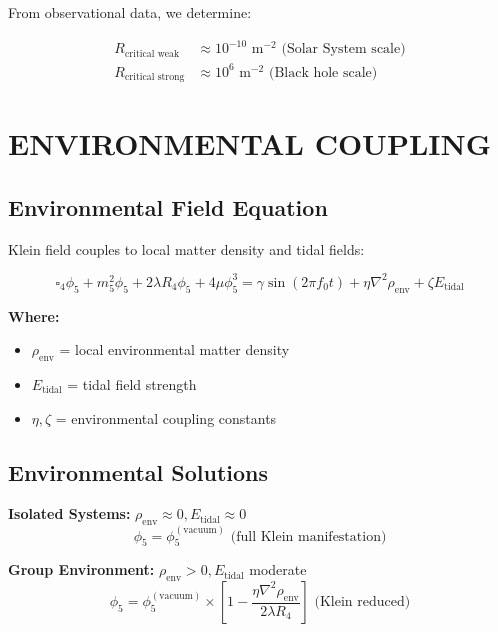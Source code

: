 \documentclass[12pt,a4paper]{article}
\begin{document}
From observational data, we determine:

\begin{align}
R_{\text{critical weak}} &\approx 10^{-10} \text{ m}^{-2} \text{ (Solar System scale)}\\
R_{\text{critical strong}} &\approx 10^6 \text{ m}^{-2} \text{ (Black hole scale)}
\end{align}

\section{ENVIRONMENTAL COUPLING}

\subsection{Environmental Field Equation}

Klein field couples to local matter density and tidal fields:

\begin{equation}
\square_4\phi_5 + m_5^2\phi_5 + 2\lambda R_4\phi_5 + 4\mu\phi_5^3 = \gamma \sin(2\pi f_0 t) + \eta\nabla^2\rho_{\text{env}} + \zeta E_{\text{tidal}}
\end{equation}

\textbf{Where:}
\begin{itemize}
\item $\rho_{\text{env}}$ = local environmental matter density
\item $E_{\text{tidal}}$ = tidal field strength
\item $\eta, \zeta$ = environmental coupling constants
\end{itemize}

\subsection{Environmental Solutions}

\textbf{Isolated Systems:} $\rho_{\text{env}} \approx 0, E_{\text{tidal}} \approx 0$
\begin{equation}
\phi_5 = \phi_5^{(\text{vacuum})} \text{ (full Klein manifestation)}
\end{equation}

\textbf{Group Environment:} $\rho_{\text{env}} > 0, E_{\text{tidal}}$ moderate
\begin{equation}
\phi_5 = \phi_5^{(\text{vacuum})} \times \left[1 - \frac{\eta\nabla^2\rho_{\text{env}}}{2\lambda R_4}\right] \text{ (Klein reduced)}
\end{equation}
\end{document}
